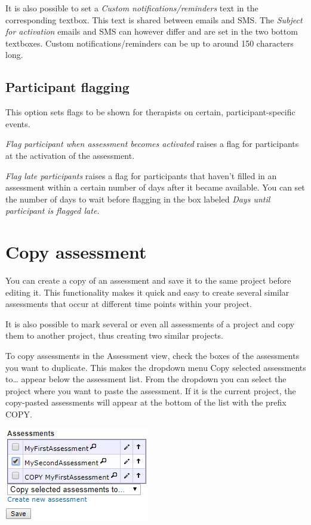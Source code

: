 \documentclass[]{book}
\begin{document}
It is also possible to set a \emph{Custom notifications/reminders} text in the corresponding textbox. This text is shared between emails and SMS. The \emph{Subject for activation} emails and SMS can however differ and are set in the two bottom textboxes. Custom notifications/reminders can be up to around 150 characters long.

\hypertarget{participant-flagging}{%
\subsection{Participant flagging}\label{participant-flagging}}

This option sets flags to be shown for therapists on certain, participant-specific events.

\emph{Flag participant when assessment becomes activated} raises a flag for participants at the activation of the assessment.

\emph{Flag late participants} raises a flag for participants that haven't filled in an assessment within a certain number of days after it became available. You can set the number of days to wait before flagging in the box labeled \emph{Days until participant is flagged late.}

\hypertarget{copy-assessment}{%
\section{Copy assessment}\label{copy-assessment}}

You can create a copy of an assessment and save it to the same project before editing it. This functionality makes it quick and easy to create several similar assessments that occur at different time points within your project.

It is also possible to mark several or even all assessments of a project and copy them to another project, thus creating two similar projects.

To copy assessments in the Assessment view, check the boxes of the assessments you want to duplicate. This makes the dropdown menu Copy selected assessments to\ldots{} appear below the assessment list. From the dropdown you can select the project where you want to paste the assessment. If it is the current project, the copy-pasted assessments will appear at the bottom of the list with the prefix COPY.

\includegraphics{images/copy-assessment.png}
\end{document}
